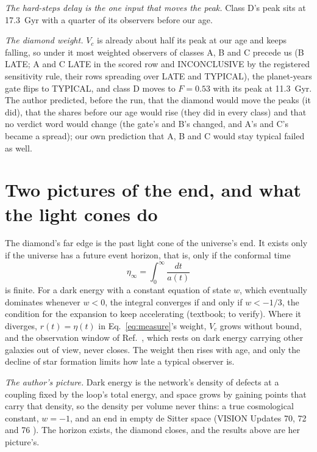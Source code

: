 \documentclass[pre,twocolumn,superscriptaddress,nofootinbib]{revtex4-2}
\begin{document}
\emph{The hard-steps delay is the one input that moves the peak.} Class D's peak sits at 17.3~Gyr with a quarter of
its observers before our age.

\emph{The diamond weight.} $V_c$ is already about half its peak at our age and keeps falling, so under it most weighted
observers of classes A, B and C precede us (B LATE; A and C LATE in the scored row and INCONCLUSIVE by the registered
sensitivity rule, their rows spreading over LATE and TYPICAL), the planet-years gate flips to TYPICAL, and class D
moves to $F = 0.53$ with its peak at 11.3~Gyr. The author predicted, before the run, that the diamond would move the
peaks (it did), that the shares before our age would rise (they did in every class) and that no verdict word would
change (the gate's and B's changed, and A's and C's became a spread); our own prediction that A, B and C would stay
typical failed as well.

\section{Two pictures of the end, and what the light cones do}

The diamond's far edge is the past light cone of the universe's end. It exists only if the universe has a future event
horizon, that is, only if the conformal time
\begin{equation}
\eta_\infty = \int_0^\infty \frac{dt}{a(t)}
\label{eq:etainf}
\end{equation}
is finite. For a dark energy with a constant equation of state $w$, which eventually dominates whenever $w < 0$, the
integral converges if and only if $w < -1/3$, the condition for the expansion to keep accelerating (textbook; to verify).
Where it diverges, $r(t) = \eta(t)$ in Eq.~\eqref{eq:measure}'s weight, $V_c$ grows without bound, and the observation
window of Ref.~\cite{KS07}, which rests on dark energy carrying other galaxies out of view, never closes. The weight then
rises with age, and only the decline of star formation limits how late a typical observer is.

\emph{The author's picture.} Dark energy is the network's density of defects at a coupling fixed by the loop's total
energy, and space grows by gaining points that carry that density, so the density per volume never thins: a true
cosmological constant, $w = -1$, and an end in empty de Sitter space (VISION Updates 70, 72 and 76 \cite{repo}). The
horizon exists, the diamond closes, and the results above are her picture's.
\end{document}
